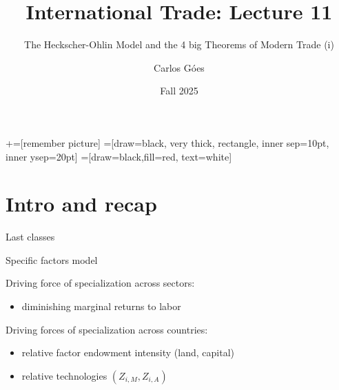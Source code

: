 \documentclass[notes,11pt, aspectratio=169, xcolor=table]{beamer}
\title[]{International Trade: Lecture 11}
\subtitle[]{The Heckscher-Ohlin Model and the 4 big Theorems of Modern Trade (i)}
\author[Góes]
{Carlos Góes\inst{1}}
\date{Fall 2025}
\institute[GWU]{\inst{1} George Washington University }
\newenvironment{wideitemize}{\itemize\addtolength{\itemsep}{10pt}}{\enditemize}
\begin{document}
\newcommand\marktopleft[1]{%
    \tikz[overlay,remember picture] 
        \node (marker-#1-a) at (-.3em,.3em) {};%
}
\newcommand\markbottomright[2]{%
    \tikz[overlay,remember picture] 
        \node (marker-#1-b) at (0em,0em) {};%
}
+=[remember picture] 
 =[draw=black, very thick, rectangle, inner sep=10pt, inner ysep=20pt]
 =[draw=black,fill=red, text=white]















\frame{\titlepage}
\addtocounter{framenumber}{-1}




\section{Intro and recap}

\begin{frame}{Last classes}
\begin{wideitemize}
    \item Specific factors model
    \item Driving force of specialization across sectors: 
    \begin{itemize}
        \item diminishing marginal returns to labor
    \end{itemize}
    \item Driving forces of specialization across countries:
    \begin{itemize}
        \item relative factor endowment intensity (land, capital)
        \item relative technologies $(Z_{i,M}, Z_{i,A})$
    \end{itemize}
\end{wideitemize}
\end{frame}
\end{document}
